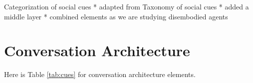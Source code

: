 \documentclass[sigconf,screen,review, anonymous]{acmart}
\newcommand{\cmt}[1]{}%
\begin{document}


Categorization of social cues \newline
* adapted from Taxonomy of social cues
* added a middle layer
* combined elements as we are studying disembodied agents

\section{Conversation Architecture}

Here is Table \ref{tab:cues} for conversation architecture elements.
\end{document}

